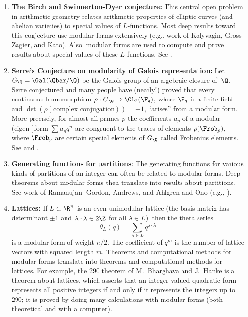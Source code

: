 \begin{enumerate}
\item {\bf The Birch and Swinnerton-Dyer conjecture:} This central
  open problem in arithmetic geometry relates arithmetic properties of
  elliptic curves (and abelian varieties) to special values of
  $L$-functions.  Most deep results toward this conjecture use modular
  forms extensively (e.g., work of Kolyvagin, Gross-Zagier, and Kato).
  Also, modular forms are used to compute and prove results about
  special values of these $L$-functions. See \cite{wiles:cmi}.

\item {\bf Serre's Conjecture on modularity of Galois representation:}
  Let $G_\Q=\Gal(\Qbar/\Q)$ be the Galois group of an algebraic
  closure of~$\Q$. Serre conjectured and many people have
  (nearly!)  proved that every continuous homomorphism $\rho:G_\Q \to
  \GL_2(\F_q)$, where $\F_q$ is a finite field and
  $\det(\rho(\text{complex conjugation}))=-1$, ``arises'' from a
  modular form.  More precisely, for almost all primes $p$ the
  coefficients $a_p$ of a modular (eigen-)form $\sum a_n q^n$ are
  congruent to the traces of elements $\rho(\Frob_p)$, where $\Frob_p$
  are certain special elements of $G_\Q$ called Frobenius elements.
  See \cite{ribet-stein:serre} and \cite[Ch.~9]{diamond-shurman}.

\item {\bf Generating functions for partitions:} The generating
  functions for various kinds of partitions of an integer can often be
  related to modular forms. Deep theorems about modular forms
  then translate into results about partitions.  See work of Ramanujan,
  Gordon, Andrews, and Ahlgren and Ono (e.g., \cite{ahlgren-ono}).

\item {\bf Lattices:} If $L\subset \R^n$ is an even unimodular lattice
  (the basis matrix has determinant $\pm 1$ and $\lambda \cdot \lambda
  \in 2\Z$ for all $\lambda \in L$), then the theta series
  $$\theta_L(q) = \sum_{\lambda \in L} q^{\lambda \cdot \lambda}$$ is
  a modular form of weight $n/2$. The coefficient of $q^m$
  is the number of lattice vectors with squared length $m$.  Theorems
  and computational methods for modular forms translate into theorems
  and computational methods for lattices.  For example, the 290
  theorem of M.~Bharghava and J.~Hanke is a theorem about lattices,
which asserts that an integer-valued quadratic form represents all
  positive integers if and only if it represents the integers up to
  $290$; it is proved by doing many calculations with
  modular forms (both theoretical and with a computer).
\end{enumerate}


